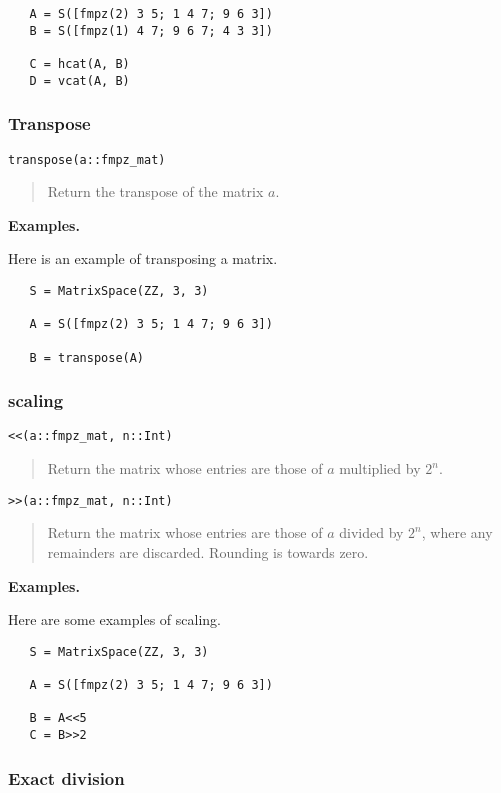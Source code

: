 \documentclass[a4paper,10pt]{article}
\newcommand{\desc}[1]{\vspace{-3mm}\begin{quote}#1\end{quote}}
\begin{document}
{{\begin{lstlisting}
   A = S([fmpz(2) 3 5; 1 4 7; 9 6 3])
   B = S([fmpz(1) 4 7; 9 6 7; 4 3 3])

   C = hcat(A, B)
   D = vcat(A, B)
\end{lstlisting}

\subsubsection{Transpose}

\begin{lstlisting}
transpose(a::fmpz_mat)
\end{lstlisting}

\desc{Return the transpose of the matrix $a$.}

\textbf{Examples.}

Here is an example of transposing a matrix.

\begin{lstlisting}
   S = MatrixSpace(ZZ, 3, 3)

   A = S([fmpz(2) 3 5; 1 4 7; 9 6 3])
 
   B = transpose(A)
\end{lstlisting}

\subsubsection{scaling}

\begin{lstlisting}
<<(a::fmpz_mat, n::Int)
\end{lstlisting}

\desc{Return the matrix whose entries are those of $a$ multiplied by $2^n$.}

\begin{lstlisting}
>>(a::fmpz_mat, n::Int)
\end{lstlisting}

\desc{Return the matrix whose entries are those of $a$ divided by $2^n$, where
any remainders are discarded. Rounding is towards zero.}

\textbf{Examples.}

Here are some examples of scaling.

\begin{lstlisting}
   S = MatrixSpace(ZZ, 3, 3)

   A = S([fmpz(2) 3 5; 1 4 7; 9 6 3])
 
   B = A<<5
   C = B>>2
\end{lstlisting}

\subsubsection{Exact division}

}}
\end{document}
